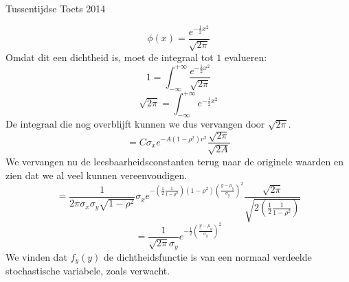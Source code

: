 \documentclass[main.tex]{subfiles}
\begin{document}
\begin{examenvraag}{Tussentijdse Toets 2014}
\begin{ex-antwoord}
    \[ \phi(x) = \frac{e^{-\frac{1}{2}x^{2}}}{\sqrt{2\pi}} \]
    Omdat dit een dichtheid is, moet de integraal tot $1$ evalueren:
    \[ 1 = \int_{-\infty}^{+\infty}\frac{e^{-\frac{1}{2}x^{2}}}{\sqrt{2\pi}} \]
    \[ \sqrt{2\pi} = \int_{-\infty}^{+\infty}e^{-\frac{1}{2}x^{2}} \]
    De integraal die nog overblijft kunnen we dus vervangen door $\sqrt{2\pi}$.
    \[
    = C\sigma_{x}e^{-A(1-\rho^{2})v^{2}}\frac{\sqrt{2\pi}}{\sqrt{2A}}
    \]
    We vervangen nu de leesbaarheidsconstanten terug naar de originele waarden en zien dat we al veel kunnen vereenvoudigen.
    \[
    = \dfrac{1}{2\pi\sigma_{x}\sigma_{y}\sqrt{1-\rho^{2}}}\sigma_{x}e^{-\left( \frac{1}{2}\frac{1}{1-\rho^{2}}\right)(1-\rho^{2})\left(\frac{y-\mu_{y}}{\sigma_{y}}\right)^{2}}\frac{\sqrt{2\pi}}{\sqrt{2\left( \frac{1}{2}\frac{1}{1-\rho^{2}}\right)}}
    \]
    \[
    = \dfrac{1}{\sqrt{2\pi}\sigma_{y}}e^{- \frac{1}{2}\left(\frac{y-\mu_{y}}{\sigma_{y}}\right)^{2}}
    \]
    We vinden dat $f_{y}(y)$ de dichtheidsfunctie is van een normaal verdeelde stochastische variabele, zoals verwacht.
  \end{ex-antwoord}
\end{examenvraag}
\end{document}
